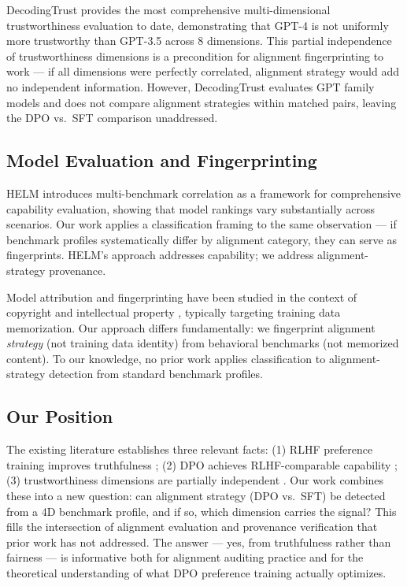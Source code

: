 DecodingTrust \cite{Wang2023DecodingTrust} provides the most comprehensive multi-dimensional
trustworthiness evaluation to date, demonstrating that GPT-4 is not uniformly more
trustworthy than GPT-3.5 across 8 dimensions. This partial independence of trustworthiness
dimensions is a precondition for alignment fingerprinting to work --- if all dimensions were
perfectly correlated, alignment strategy would add no independent information. However,
DecodingTrust evaluates GPT family models and does not compare alignment strategies within
matched pairs, leaving the DPO vs.\ SFT comparison unaddressed.

\subsection{Model Evaluation and Fingerprinting}

HELM \cite{Liang2022Holistic} introduces multi-benchmark correlation as a framework for
comprehensive capability evaluation, showing that model rankings vary substantially across
scenarios. Our work applies a classification framing to the same observation --- if benchmark
profiles systematically differ by alignment category, they can serve as fingerprints.
HELM's approach addresses capability; we address alignment-strategy provenance.

Model attribution and fingerprinting have been studied in the context of copyright and
intellectual property \cite{Zhao2023Protecting}, typically targeting training data memorization.
Our approach differs fundamentally: we fingerprint alignment \textit{strategy} (not training data
identity) from behavioral benchmarks (not memorized content). To our knowledge, no prior
work applies classification to alignment-strategy detection from standard benchmark profiles.

\subsection{Our Position}

The existing literature establishes three relevant facts: (1) RLHF preference training
improves truthfulness \cite{Ouyang2022Training}; (2) DPO achieves RLHF-comparable capability
\cite{Rafailov2023Direct}; (3) trustworthiness dimensions are partially independent \cite{Wang2023DecodingTrust}.
Our work combines these into a new question: can alignment strategy (DPO vs.\ SFT)
be detected from a 4D benchmark profile, and if so, which dimension carries the signal?
This fills the intersection of alignment evaluation and provenance verification that prior
work has not addressed. The answer --- yes, from truthfulness rather than fairness --- is
informative both for alignment auditing practice and for the theoretical understanding of
what DPO preference training actually optimizes.

